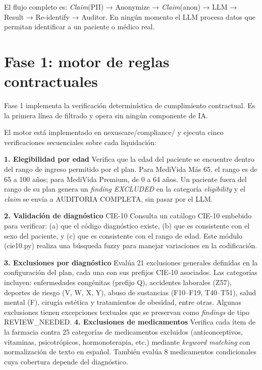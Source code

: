 El flujo completo es: \textit{Claim}(PII) → Anonymize → \textit{Claim}(anon) → LLM → Result → Re-identify → Auditor. En ningún momento el LLM procesa datos que permitan identificar a un paciente o médico real.

\section{Fase 1: motor de reglas contractuales}

Fase 1 implementa la verificación determinística de cumplimiento contractual. Es la primera línea de filtrado y opera sin ningún componente de IA.

El motor está implementado en nexuscare/compliance/ y ejecuta cinco verificaciones secuenciales sobre cada liquidación:

\noindent \textbf{1. Elegibilidad por edad} Verifica que la edad del paciente se encuentre dentro del rango de ingreso permitido por el plan. Para MediVida Más 65, el rango es de 65 a 100 años; para MediVida Premium, de 0 a 64 años. Un paciente fuera del rango de su plan genera un \textit{finding EXCLUDED} en la categoría \textit{eligibility} y el \textit{claim} se envía a AUDITORIA COMPLETA, sin pasar por el LLM.

\noindent \textbf{2. Validación de diagnóstico} CIE-10 Consulta un catálogo CIE-10 embebido para verificar: (a) que el código diagnóstico existe, (b) que es consistente con el sexo del paciente, y (c) que es consistente con el rango de edad. Este módulo (cie10.py) realiza una búsqueda fuzzy para manejar variaciones en la codificación.


\noindent \textbf{3. Exclusiones por diagnóstico} Evalúa 21 exclusiones generales definidas en la configuración del plan, cada una con sus prefijos CIE-10 asociados. Las categorías incluyen: enfermedades congénitas (prefijo Q), accidentes laborales (Z57), deportes de riesgo (V, W, X, Y), abuso de sustancias (F10–F19, T40–T51), salud mental (F), cirugía estética y tratamientos de obesidad, entre otras. Algunas exclusiones tienen excepciones textuales que se preservan como \textit{findings} de tipo REVIEW\_NEEDED.
\noindent \textbf{4. Exclusiones de medicamentos} Verifica cada ítem de la farmacia contra 25 categorías de medicamentos excluidos (anticonceptivos, vitaminas, psicotrópicos, hormonoterapia, etc.) mediante \textit{keyword matching} con normalización de texto en español. También evalúa 8 medicamentos condicionales cuya cobertura depende del diagnóstico.

